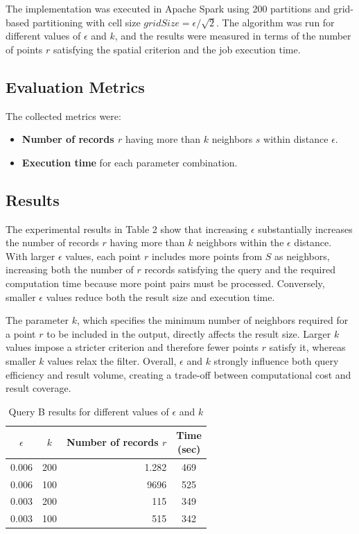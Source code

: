 \documentclass[sigconf,nonacm]{acmart}
\begin{document}
The implementation was executed in Apache Spark using 200 partitions and grid-based partitioning with cell size $gridSize = \epsilon / \sqrt{2}$. The algorithm was run for different values of $\epsilon$ and $k$, and the results were measured in terms of the number of points $r$ satisfying the spatial criterion and the job execution time.

\subsection{Evaluation Metrics}
The collected metrics were:
\begin{itemize}
    \item \textbf{Number of records $r$} having more than $k$ neighbors $s$ within distance $\epsilon$.
    \item \textbf{Execution time} for each parameter combination.
\end{itemize}

\subsection{Results}
The experimental results in Table 2 show that increasing $\epsilon$ substantially increases the number of records $r$ having more than $k$ neighbors within the $\epsilon$ distance. With larger $\epsilon$ values, each point $r$ includes more points from $S$ as neighbors, increasing both the number of $r$ records satisfying the query and the required computation time because more point pairs must be processed. Conversely, smaller $\epsilon$ values reduce both the result size and execution time.

The parameter $k$, which specifies the minimum number of neighbors required for a point $r$ to be included in the output, directly affects the result size. Larger $k$ values impose a stricter criterion and therefore fewer points $r$ satisfy it, whereas smaller $k$ values relax the filter. Overall, $\epsilon$ and $k$ strongly influence both query efficiency and result volume, creating a trade-off between computational cost and result coverage.

\begin{table}[t]
\centering
\caption{Query B results for different values of $\epsilon$ and $k$}\label{tab:results-queryb}
\begin{tabular}{@{}ccrc@{}}
\toprule
$\epsilon$ & $k$ & \shortstack{Number of \\ records $r$} & \shortstack{Time \\ (sec)} \\
\midrule
0.006 & 200 & 1.282 & 469 \\
0.006 & 100 & 9696 &  525 \\
0.003 & 200 & 115 & 349 \\
0.003 & 100 & 515 & 342 \\
\bottomrule
\end{tabular}
\end{table}
\end{document}
